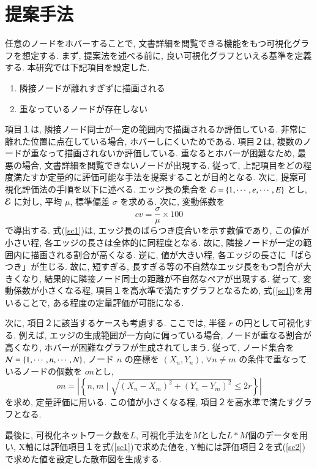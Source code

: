 \documentclass[a4j,fleqn,10pt]{jarticle}
\begin{document}
\section{提案手法}\label{sec:PROP}
任意のノードをホバーすることで, 文書詳細を閲覧できる機能をもつ可視化グラフを想定する.
まず, 提案法を述べる前に, 良い可視化グラフといえる基準を定義する.
本研究では下記項目を設定した.
\begin{enumerate}
    \item 隣接ノードが離れすぎずに描画される
    \item 重なっているノードが存在しない
\end{enumerate}
項目１は, 隣接ノード同士が一定の範囲内で描画されるか評価している.
非常に離れた位置に点在している場合, ホバーしにくいためである.
項目２は, 複数のノードが重なって描画されないか評価している.
重なるとホバーが困難なため, 最悪の場合, 文書詳細を閲覧できないノードが出現する.
従って, 上記項目をどの程度満たすか定量的に評価可能な手法を提案することが目的となる.
次に, 提案可視化評価法の手順を以下に述べる.
エッジ長の集合を ${\cal E} = \{1, \cdots, e, \cdots, E \}$ とし,
${\cal E}$ に対し, 平均 $\mu$, 標準偏差 $\sigma$ を求める.
次に, 変動係数を
\begin{equation}
  {cv} = \frac{\sigma}{\mu} \times 100
  \label{sc1}
\end{equation}
で導出する.
式(\ref{sc1})は, エッジ長のばらつき度合いを示す数値であり,
この値が小さい程, 各エッジの長さは全体的に同程度となる.
故に, 隣接ノードが一定の範囲内に描画される割合が高くなる.
逆に, 値が大きい程, 各エッジの長さに「ばらつき」が生じる.
故に, 短すぎる, 長すぎる等の不自然なエッジ長をもつ割合が大きくなり, 
結果的に隣接ノード同士の距離が不自然なペアが出現する.
従って, 変動係数が小さくなる程, 項目１を高水準で満たすグラフとなるため,
式(\ref{sc1})を用いることで, ある程度の定量評価が可能になる.

次に, 項目２に該当するケースも考慮する.
ここでは, 半径 $r$ の円として可視化する.
例えば, エッジの生成範囲が一方向に偏っている場合, 
ノードが重なる割合が高くなり, ホバーが困難なグラフが生成されてしまう.
従って, ノード集合を ${\cal N} = \{1, \cdots, n, \cdots, N \}$, 
ノード $n$ の座標を $(X_n, Y_n)$, $\forall n \neq m$ の条件で重なっているノードの個数を $on$とし,
\begin{equation}
  {on} = |\left\{ n, m \mid \sqrt{(X_n - X_m)^2 + (Y_n - Y_m)^2} \leq 2r \right\}|
  \label{sc2}
\end{equation}
を求め, 定量評価に用いる.
この値が小さくなる程, 項目２を高水準で満たすグラフとなる.

最後に, 可視化ネットワーク数を$L$, 可視化手法を$M$とした$L*M$個のデータを用い, 
X軸には評価項目１を式(\ref{sc1})で求めた値を,
Y軸には評価項目２を式(\ref{sc2})で求めた値を設定した散布図を生成する. 
\end{document}
